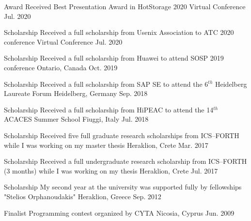\begin{cvhonors}
  \cvhonor
    {Award} %
    {Received Best Presentation Award in HotStorage 2020} %
    {Virtual Conference} %
    {Jul. 2020} %

  \cvhonor
    {Scholarship} %
    {Received a full scholarship from Usenix Association to ATC 2020
	conference} %
    {Virtual Conference} %
    {Jul. 2020} %

  \cvhonor
    {Scholarship} %
    {Received a full scholarship from Huawei to attend SOSP 2019
	conference} %
    {Ontario, Canada} %
    {Oct. 2019} %

  \cvhonor
    {Scholarship} %
    {Received a full scholarship from SAP SE to attend the 6$^{th}$
    Heidelberg Laureate Forum} %
    {Heidelberg, Germany} %
    {Sep. 2018} %

  \cvhonor
    {Scholarship} %
    {Received a full scholarship from HiPEAC to attend the 14$^{th}$
    ACACES Summer School} %
    {Fiuggi, Italy} %
    {Jul. 2018} %

  \cvhonor
    {Scholarship} %
    {Received five full graduate research scholarships from ICS--FORTH
     while I was working on my master thesis} %
    {Heraklion, Crete} %
    {Mar. 2017} %

  \cvhonor
    {Scholarship} %
    {Received a full undergraduate research scholarship from
    ICS--FORTH (3 months) while I was working on my thesis} %
    {Heraklion, Crete} %
    {Jul. 2017} %
  
  \cvhonor
    {Scholarship} %
    {My second year at the university was supported fully by
          fellowships "Stelios Orphanoudakis"} %
    {Heraklion, Greece} %
    {Sep. 2012} %

  \cvhonor
    {Finalist} %
    {Programming contest organized by CYTA} %
    {Nicosia, Cyprus} %
    {Jun. 2009} %

\end{cvhonors}
